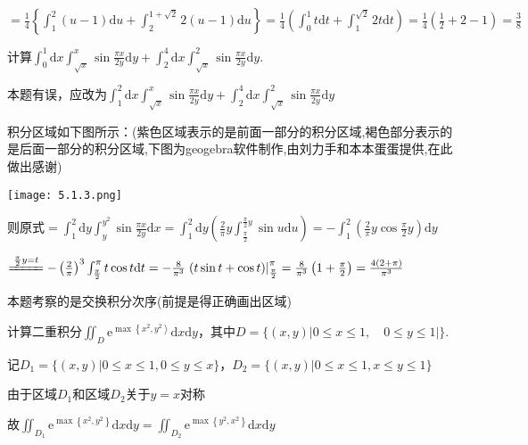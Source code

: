\begin{xiti}
\begin{solution}
		$=\frac{1}{4}\left\{\int_{1}^{2}(u-1) \mathrm{d} u+\int_{2}^{1+\sqrt{2}} 2(u-1) \mathrm{d} u\right\}=\frac{1}{4}\left(\int_{0}^{1} t \mathrm{d} t+\int_{1}^{\sqrt{2}} 2 t \mathrm{d} t\right)=\frac{1}{4}\left(\frac{1}{2}+2-1\right)=\frac{3}{8}$
	\end{solution}
	\item 计算$\int_{0}^{1} \mathrm{d} x \int_{\sqrt{x}}^{x} \sin \frac{\pi x}{2 y} \mathrm{d} y+\int_{2}^{4} \mathrm{d} x \int_{\sqrt{x}}^{2} \sin \frac{\pi x}{2 y} \mathrm{d} y$.
	\begin{note}
		本题有误，应改为$\int_{1}^{2} \mathrm{d} x \int_{\sqrt{x}}^{x} \sin \frac{\pi x}{2 y} \mathrm{d} y+\int_{2}^{4} \mathrm{d} x \int_{\sqrt{x}}^{2} \sin \frac{\pi x}{2 y} \mathrm{d} y$	
	\end{note}
	\begin{solution}
		积分区域如下图所示：(紫色区域表示的是前面一部分的积分区域,褐色部分表示的是后面一部分的积分区域,下图为geogebra软件制作,由刘力手和本本蛋蛋提供,在此做出感谢)
		
		\texttt{[image: 5.1.3.png]}
	
		则原式$=\int_{1}^{2} \mathrm{d} y \int_{y}^{y^{2}} \sin \frac{\pi x}{2 y} \mathrm{d} x=\int_{1}^{2} \mathrm{d} y\left(\frac{2}{\pi} y \int_{\frac{\pi}{2}}^{\frac{\pi}{2} y} \sin u \mathrm{d} u\right)=-\int_{1}^{2}\left(\frac{2}{\pi} y \cos \frac{\pi}{2} y\right) \mathrm{d} y$
		
		$\xlongequal{\frac{\pi}{2}y = t }-\left(\frac{2}{\pi}\right)^{3} \int_{\frac{\pi}{2}}^{\pi} t \cos t \mathrm{d} t=-\frac{8}{\pi^{3}}\left.(t \sin t+\cos t)\right|_{\frac{\pi}{2}} ^{\pi}=\frac{8}{\pi^{3}}\left(1+\frac{\pi}{2}\right)=\frac{4(2+\pi)}{\pi^{3}}$
		
		\begin{note}
			本题考察的是交换积分次序(前提是得正确画出区域)
		\end{note}
	\end{solution}
	\item 计算二重积分$\iint_{D} \mathrm{e}^{\max \left\{x^{2}, y^{2}\right\rangle} \mathrm{d} x \mathrm{d} y$，其中$D=\{(x, y)|0 \leqslant x \leqslant 1, \quad 0 \leqslant y \leqslant 1|\}$.
	\begin{solution}
		记$D_{1}=\{(x, y) | 0 \leq x \leq 1,0 \leq y \leq x\}$，$D_{2}=\{(x, y) | 0 \leq x \leq 1, x \leq y \leq 1\}$
		
		由于区域$D_{1}$和区域$D_{2}$关于$y=x$对称
		
		故$\iint_{D_{1}} \mathrm{e}^{\max \left\{x^{2}, y^{2}\right\}} \mathrm{d} x \mathrm{d} y=\iint_{D_{2}} \mathrm{e}^{\max \left\{y^{2}, x^{2}\right\}} \mathrm{d} x \mathrm{d} y$
		

\end{solution}
\end{xiti}
